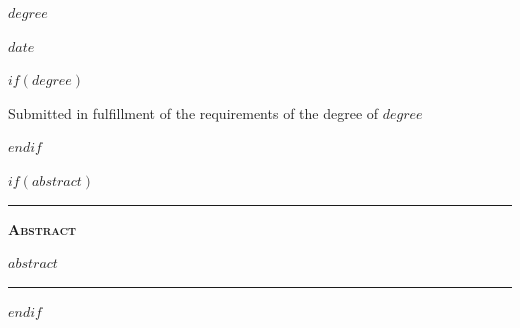 {{\bfseries\Large\textit{$degree$} \par}
\vspace{3ex}

{\large $date$ \par}
\vspace{3ex}

\vspace{10ex}
$if(degree)$
{\small Submitted in fulfillment of the requirements
of the degree of $degree$ \par}
$endif$
\pagebreak


$if(abstract)$
\vspace*{\fill} %
\noindent
\begin{minipage}{.8\textwidth}
    \centering
    \hspace*{\fill}\rule{0.5\textwidth}{0.4pt}\hspace*{\fill} %
    \par \vspace{2em} %
    {\Large\bfseries\scshape Abstract} %
    \par %
    \vspace{1em} %
    \justifying %
    $abstract$ %
    \par %
    \vspace{2em} %
    \hspace*{\fill}\rule{0.5\textwidth}{0.4pt}\hspace*{\fill} %
\end{minipage}
\vspace*{\fill} %
$endif$

}